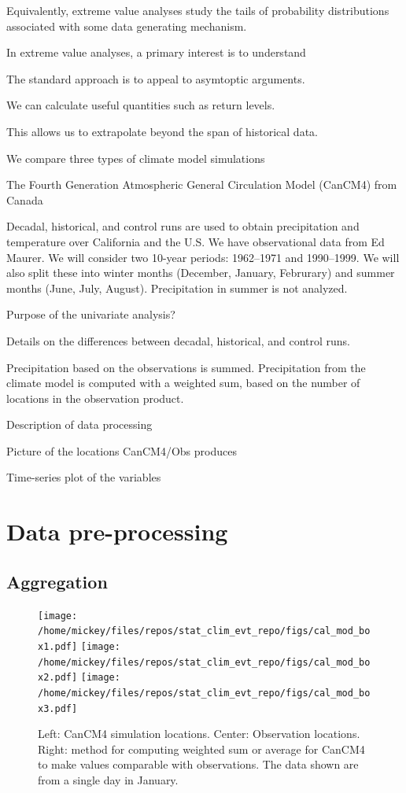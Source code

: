 \documentclass[12pt]{article}
\begin{document}
Equivalently, extreme value analyses study the tails of probability distributions associated with some data generating mechanism. 

In extreme value analyses, a primary interest is to understand 

The standard approach is to appeal to asymtoptic arguments.

We can calculate useful quantities such as return levels.

This allows us to extrapolate beyond the span of historical data.


We compare three types of climate model simulations 

The Fourth Generation Atmospheric General Circulation Model (CanCM4) from Canada 

Decadal, historical, and control runs are used to obtain precipitation and temperature over California and the U.S. We have observational data from Ed Maurer. We will consider two 10-year periods: 1962--1971 and 1990--1999. We will also split these into winter months (December, January, Februrary) and summer months (June, July, August). Precipitation in summer is not analyzed.
\bigskip

Purpose of the univariate analysis?
\bigskip

Details on the differences between decadal, historical, and control runs.
\bigskip

Precipitation based on the observations is summed. Precipitation from the climate model is computed with a weighted sum, based on the number of locations in the observation product.
\bigskip

Description of data processing
\bigskip

Picture of the locations CanCM4/Obs produces
\bigskip

Time-series plot of the variables
\bigskip

\section{Data pre-processing}

\subsection{Aggregation}

\begin{figure}
\begin{center}
\texttt{[image: /home/mickey/files/repos/stat\_clim\_evt\_repo/figs/cal\_mod\_box1.pdf]}
\texttt{[image: /home/mickey/files/repos/stat\_clim\_evt\_repo/figs/cal\_mod\_box2.pdf]}
\texttt{[image: /home/mickey/files/repos/stat\_clim\_evt\_repo/figs/cal\_mod\_box3.pdf]}
\end{center}
\caption{Left: CanCM4 simulation locations. Center: Observation locations. Right: method for computing weighted sum or average for CanCM4 to make values comparable with observations. The data shown are from a single day in January.}
\end{figure}
\end{document}
